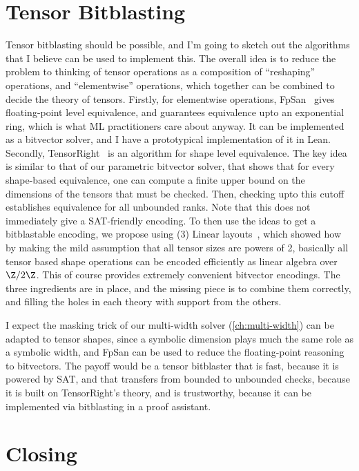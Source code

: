 \section{Tensor Bitblasting}

Tensor bitblasting should be possible, and I'm going to sketch out the algorithms that I believe can be used to implement this.
The overall idea is to reduce the problem to thinking of tensor operations as a composition of ``reshaping'' operations,
and ``elementwise'' operations, which together can be combined to decide the theory of tensors.
Firstly, for elementwise operations, FpSan~\citep{openai2026fpsan} gives floating-point level equivalence, and guarantees equivalence upto an exponential ring,
which is what ML practitioners care about anyway. It can be implemented as a bitvector solver, and I have a prototypical implementation of it in Lean.
Secondly, TensorRight~\citep{arora2025tensorright} is an algorithm for shape level equivalence.
The key idea is similar to that of our parametric bitvector solver,
that shows that for every shape-based equivalence, one can compute a finite upper bound on the dimensions of the tensors that must be checked.
Then, checking upto this cutoff establishes equivalence for all unbounded ranks.
Note that this does not immediately give a SAT-friendly encoding.
To then use the ideas to get a bitblastable encoding, we propose using (3) Linear layouts~\citep{zhou2026linear}, which showed how by making the mild assumption that all tensor sizes are powers of 2,
basically all tensor based shape operations can be encoded efficiently as linear algebra over $\Z/2\Z$. This of course provides extremely convenient bitvector encodings.
The three ingredients are in place, and the missing piece is to combine them correctly, and filling the holes in each theory with support from the others.

I expect the masking trick of our multi-width solver (\cref{ch:multi-width})
can be adapted to tensor shapes, since a symbolic dimension plays much the same role as a symbolic width,
and FpSan can be used to reduce the floating-point reasoning to bitvectors.
The payoff would be a tensor bitblaster that is fast, because it is powered by SAT,
and that transfers from bounded to unbounded checks, because it is built on TensorRight's theory,
and is trustworthy, because it can be implemented via bitblasting in a proof assistant.

\section*{Closing}

